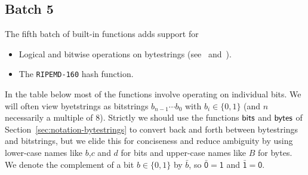 \renewcommand{\note}[1]{
  \bigskip
  \refstepcounter{notenumberE}
  \noindent\textbf{Note \thenotenumberE. #1}
}

\newcommand\Xand{\mathsf{and}}
\newcommand\Xor{\mathsf{or}}
\newcommand\Xxor{\mathsf{xor}}
\newcommand{\extzero}[1]{\mathtt{0}^*{\cdot}#1}
\newcommand{\extone}[1]{\mathtt{1}^*{\cdot}#1}

\subsection{Batch 5}
\label{sec:default-builtins-5}
The fifth batch of built-in functions adds support for
\begin{itemize}
\item Logical and bitwise operations on bytestrings (see~\cite{CIP-0122} and~\cite{CIP-0123}).
\item The \texttt{RIPEMD-160} hash function.
\end{itemize}

\noindent In the table below most of the functions involve operating on individual bits.
We will often view byetstrings as bitstrings $b_{n-1}\cdots b_0$ with
$b_i \in \{0,1\}$ (and $n$ necessarily a multiple of 8).  Strictly we should use
the functions $\mathsf{bits}$ and $\mathsf{bytes}$ of Section~\ref{sec:notation-bytestrings}
to convert back and forth between bytestrings and bitstrings, but we elide this
for conciseness and reduce ambiguity by using lower-case names like $b$,$c$ and
$d$ for bits and upper-case names like $B$ for bytes. We denote the complement of a
bit $b \in \{0,1\}$ by $\bar{b}$, so $\bar{\textsf{0}} = \textsf{1}$ and
$\bar{\textsf{1}} = \textsf{0}$.


